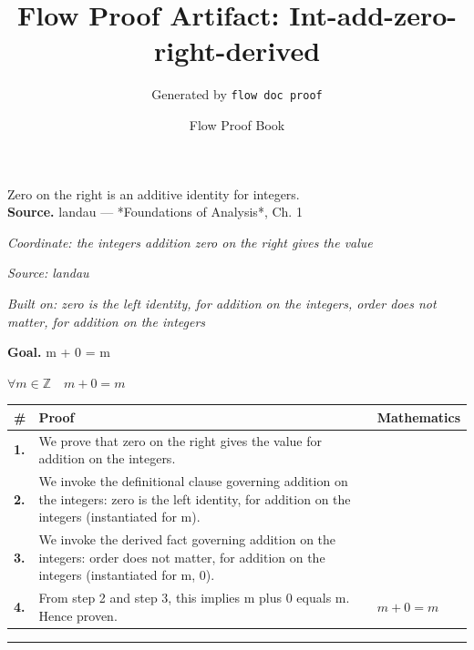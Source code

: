 \documentclass[11pt]{article}
\title{Flow Proof Artifact: Int-add-zero-right-derived}
\author{Generated by \texttt{flow doc proof}}
\date{Flow Proof Book}
\theoremstyle{definition}
\begin{document}
\maketitle
Zero on the right is an additive identity for integers.\\[0.5em]
\textbf{Source.} landau — *Foundations of Analysis*, Ch. 1\\[0.5em]
\bigskip
{}\par
\smallskip\noindent\textit{Coordinate: the integers \cdot addition \cdot zero on the right gives the value}\par
\smallskip\noindent\textit{Source: landau}\par
\smallskip\noindent\textit{Built on: zero is the left identity, for addition on the integers, order does not matter, for addition on the integers}\par
\medskip
\noindent\textbf{Goal.} m + 0 = m\par
\noindent$\displaystyle \forall m \in \mathbb{Z}\quad m + 0 = m$\par
\medskip
\noindent
\begin{tabular}{@{} >{\raggedright\arraybackslash}p{} >{\raggedright\arraybackslash}p{} >{\raggedleft\arraybackslash}p{} @{}}
\textbf{\#} & \textbf{Proof} & \textbf{Mathematics} \\
\midrule
\textbf{1.} & We prove that zero on the right gives the value for addition on the integers. & \\[0.45em]
\textbf{2.} & We invoke the definitional clause governing addition on the integers: zero is the left identity, for addition on the integers (instantiated for m). & \\[0.45em]
\textbf{3.} & We invoke the derived fact governing addition on the integers: order does not matter, for addition on the integers (instantiated for m, 0). & \\[0.45em]
\textbf{4.} & From step 2 and step 3, this implies m plus 0 equals m. Hence proven. & $\displaystyle m + 0 = m$ \\[0.45em]
\bottomrule
\end{tabular}
\label{thm:Int-addition-zero_on_the_right_gives_the_value}
\par\medskip\hrule
\end{document}
